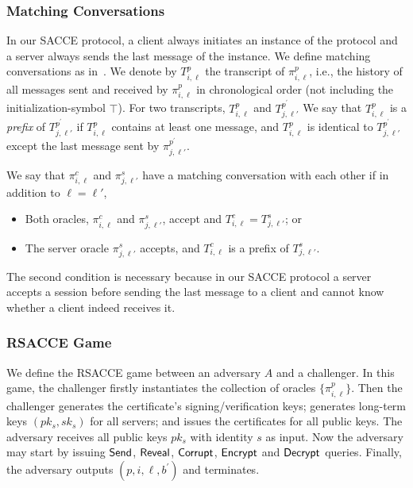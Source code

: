 \subsubsection{Matching Conversations}
In our SACCE protocol, a client always initiates an instance of the protocol and
a server always sends the last message of the instance.
We define matching conversations as in~\cite{JKSS12:ACCE}.
We denote by $T^p_{i,\ell}$ the transcript of $\pi^p_{i,\ell}$, i.e., the history of
all messages sent and received by $\pi^p_{i,\ell}$ in chronological order (not including the initialization-symbol $\top$).
For two transcripts, $T^p_{i,\ell}$ and $T^{p^{\prime}}_{j,\ell'}$
We say that $T^p_{i,\ell}$ is a \textit{prefix} of $T^{p^{\prime}}_{j,\ell'}$ if
$T^p_{i,\ell}$ contains at least one message, and
$T^p_{i,\ell}$ is identical to $T^{p^{\prime}}_{j,\ell'}$ except the last message sent
by $\pi^{p^{\prime}}_{j,\ell'}$.

\begin{definition}
 We say that $\pi^c_{i,\ell}$ and $\pi^s_{j,\ell'}$ have a matching conversation with each other if  in addition to $\ell=\ell'$,
 \begin{itemize}
  \item{Both oracles, $\pi^c_{i, \ell}$ and $\pi^s_{j,\ell'}$, accept and
  $T^c_{i,\ell} = T^s_{j,\ell'}$; or }
  \item{The server oracle $\pi^s_{j, \ell'}$ accepts,
  and $T^c_{i,\ell}$ is a prefix of $T^s_{j,\ell'}$.}
 \end{itemize}
\end{definition}
\begin{remark}
 The second condition is necessary because in our SACCE protocol
 a server accepts a session before sending the last message to a client
 and cannot know whether a client indeed receives it.
\end{remark}

\subsubsection{RSACCE Game}
We define the RSACCE game between an adversary $A$ and a challenger.
In this game, the challenger firstly instantiates the collection of oracles
$\{\pi^p_{i,\ell}\}$.
Then the challenger generates the certificate's signing/verification keys;
generates long-term keys $(pk_s, sk_s)$ for all servers;
and issues the certificates for all public keys.
The adversary receives all public keys $pk_s$ with identity $s$ as input.
Now the adversary may start by issuing $\mathsf{Send}$, $\mathsf{Reveal}$, $\mathsf{Corrupt}$, $\mathsf{Encrypt}$ and $\mathsf{Decrypt}$ queries.
Finally, the adversary outputs $(p, i, \ell, b^{\prime})$ and terminates.

